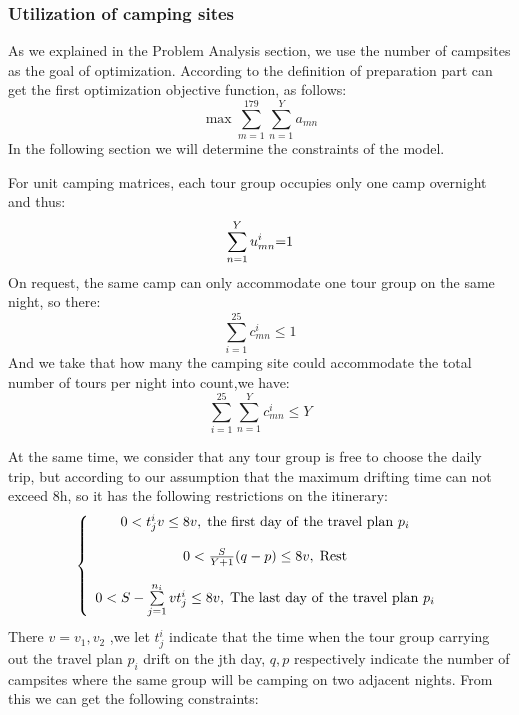 \subsubsection{Utilization of camping sites}
\noindent
As we explained in the Problem Analysis section, we use the number of campsites as the goal of optimization. According to the definition of preparation part can get the first optimization objective function, as follows:
	\begin{equation}
	\max \sum\limits_{m = 1}^{179} {\sum\limits_{n = 1}^Y {{a_{mn}}} }\label{aa1}
	\end{equation}
In the following section we will determine the constraints of the model.
\par For unit camping matrices, each tour group occupies only one camp overnight and thus:
	\begin{equation}
	\sum\limits_{n = 1}^Y {u_{mn}^i} {\rm{ = }}1\label{aa1}
	\end{equation}
On request, the same camp can only accommodate one tour group on the same night, so there:
	\begin{equation}
	\sum\limits_{i = 1}^{25} {c_{mn}^i}  \le 1\label{aa1}
	\end{equation}
And we take that how many the camping site could accommodate the total number of tours per night into count,we have:
	\begin{equation}
	\sum\limits_{i = 1}^{25} {\sum\limits_{n = 1}^Y {c_{mn}^i \le Y} }\label{aa1}
	\end{equation}	
\par At the same time, we consider that any tour group is free to choose the daily trip, but according to our assumption that the maximum drifting time can not exceed 8h, so it has the following restrictions on the itinerary:
	\begin{equation}
	\left\{ {\begin{array}{*{20}{c}}
		{0 < t_j^iv \le 8v,\;{\rm{the\ first\ day\ of\  the\ travel\ plan\ }}{p_i}}\\
		\\
		{0 < \frac{S}{{Y + 1}}(q - p) \le 8v,\;{\rm{Rest}}}\\
		\\
		{{\rm{   }}0 < S - \sum\limits_{j = 1}^{{n_i}} {vt_j^i \le 8v,\;{\rm{The\ last\ day\ of\ the\ travel\ plan\ }}{p_i}} }
		\end{array}} \right.\label{aa1}
	\end{equation}
There $v = {v_1},{v_2}$ ,we let $t_j^i$ indicate that the time when the tour group carrying out the travel plan ${p_i}$ drift on the jth day, $q,p$  respectively indicate the number of campsites where the same group will be camping on two adjacent nights. From this we can get the following constraints:
